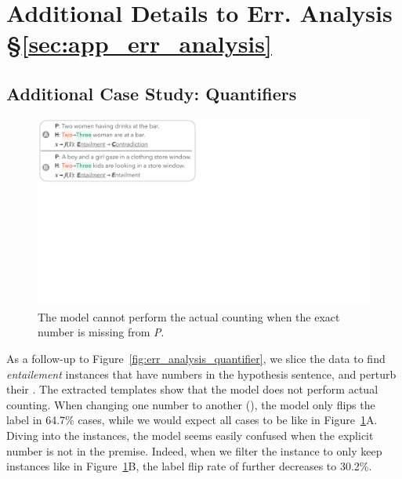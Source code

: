 \section{Additional Details to Err. Analysis \S\ref{sec:app_err_analysis}}
\label{appendix:err_analysis}

\subsection{Additional Case Study: Quantifiers}
\label{appendix:err_analysis_quantifier_case}

\begin{figure}[t]
\centering
\includegraphics[trim={0 25.2cm 34.5cm 0cm},clip,width=1\columnwidth]{figures/err_analysis_two_three}
\vspace{-20pt}
\caption{
The \nli model cannot perform the actual counting when the exact number is missing from \emph{P}.
}
\vspace{-10pt}
\label{fig:err_analysis_two_three}
\end{figure}



As a follow-up to Figure~\ref{fig:err_analysis_quantifier}, we slice the data to find \emph{entailement} instances that have numbers in the hypothesis sentence, and perturb their .
The extracted templates show that the model does not perform actual counting. 
When changing one number to another (), the model only flips the label in 64.7\% cases, while we would expect all cases to be like in Figure~\ref{fig:err_analysis_two_three}A.
Diving into the instances, the model seems easily confused when the explicit number is not in the premise. 
Indeed, when we filter the instance to only keep instances like in Figure~\ref{fig:err_analysis_two_three}B, the label flip rate of  further decreases to 30.2\%.

